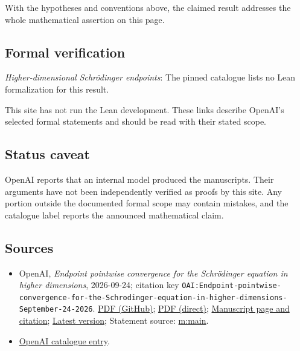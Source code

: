 \documentclass[11pt]{article}
\begin{document}
With the hypotheses and conventions above, the claimed result addresses the whole mathematical assertion on this page.

\subsection{Formal verification}
\textit{Higher-dimensional Schrödinger endpoints}: The pinned catalogue lists no Lean formalization for this result.

This site has not run the Lean development. These links describe OpenAI’s selected formal statements and should be read with their stated scope.

\subsection{Status caveat}
OpenAI reports that an internal model produced the manuscripts. Their arguments have not been independently verified as proofs by this site. Any portion outside the documented formal scope may contain mistakes, and the catalogue label reports the announced mathematical claim.

\subsection{Sources}
\begin{itemize}
\item OpenAI, \emph{Endpoint pointwise convergence for the Schrödinger equation in higher dimensions}, 2026-09-24; citation key \texttt{OAI:Endpoint-pointwise-convergence-for-the-Schrodinger-equation-in-higher-dimensions-September-24-2026}. \href{https://github.com/openai/math/blob/adc7f1241b42e322a6451854ab7e4b4c146bf78a/preprints/Endpoint-pointwise-convergence-for-the-Schrodinger-equation-in-higher-dimensions-September-24-2026/paper.pdf}{PDF (GitHub)}; \href{https://github.com/openai/math/raw/adc7f1241b42e322a6451854ab7e4b4c146bf78a/preprints/Endpoint-pointwise-convergence-for-the-Schrodinger-equation-in-higher-dimensions-September-24-2026/paper.pdf}{PDF (direct)}; \href{https://github.com/openai/math/blob/adc7f1241b42e322a6451854ab7e4b4c146bf78a/preprints/Endpoint-pointwise-convergence-for-the-Schrodinger-equation-in-higher-dimensions-September-24-2026/README.md}{Manuscript page and citation}; \href{https://github.com/openai/math/blob/main/preprints/Endpoint-pointwise-convergence-for-the-Schrodinger-equation-in-higher-dimensions-September-24-2026/paper.pdf}{Latest version}; Statement source: \href{https://github.com/openai/math/blob/adc7f1241b42e322a6451854ab7e4b4c146bf78a/preprints/Endpoint-pointwise-convergence-for-the-Schrodinger-equation-in-higher-dimensions-September-24-2026/build/sections/introduction.tex\#L34}{m:main}.
\item \href{https://github.com/openai/math/blob/adc7f1241b42e322a6451854ab7e4b4c146bf78a/CONTENTS.md}{OpenAI catalogue entry}.
\end{itemize}
\end{document}
